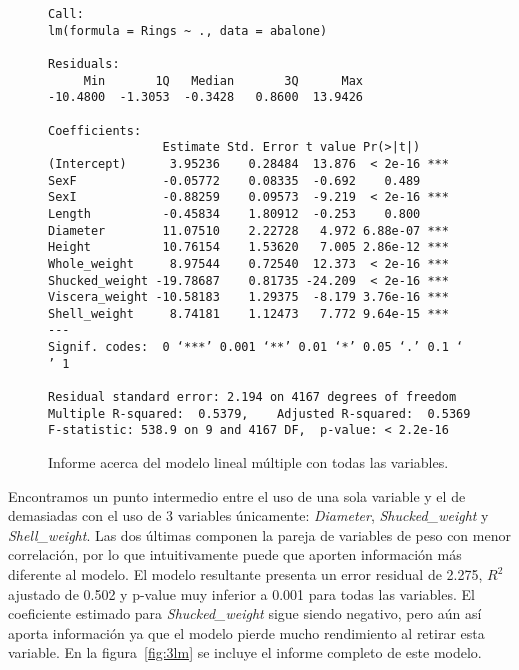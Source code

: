 \documentclass[a4paper, 11pt]{article}
\begin{document}
\begin{figure}[htbp]
  \begin{Verbatim}[fontsize=\scriptsize]
Call:
lm(formula = Rings ~ ., data = abalone)

Residuals:
     Min       1Q   Median       3Q      Max 
-10.4800  -1.3053  -0.3428   0.8600  13.9426 

Coefficients:
                Estimate Std. Error t value Pr(>|t|)    
(Intercept)      3.95236    0.28484  13.876  < 2e-16 ***
SexF            -0.05772    0.08335  -0.692    0.489    
SexI            -0.88259    0.09573  -9.219  < 2e-16 ***
Length          -0.45834    1.80912  -0.253    0.800    
Diameter        11.07510    2.22728   4.972 6.88e-07 ***
Height          10.76154    1.53620   7.005 2.86e-12 ***
Whole_weight     8.97544    0.72540  12.373  < 2e-16 ***
Shucked_weight -19.78687    0.81735 -24.209  < 2e-16 ***
Viscera_weight -10.58183    1.29375  -8.179 3.76e-16 ***
Shell_weight     8.74181    1.12473   7.772 9.64e-15 ***
---
Signif. codes:  0 ‘***’ 0.001 ‘**’ 0.01 ‘*’ 0.05 ‘.’ 0.1 ‘ ’ 1

Residual standard error: 2.194 on 4167 degrees of freedom
Multiple R-squared:  0.5379,	Adjusted R-squared:  0.5369 
F-statistic: 538.9 on 9 and 4167 DF,  p-value: < 2.2e-16
  \end{Verbatim}
  \caption{\label{fig:multlm}Informe acerca del modelo lineal múltiple con todas las variables.}
  
\end{figure}


Encontramos un punto intermedio entre el uso de una sola variable y el de demasiadas con el uso de 3 variables únicamente: \textit{Diameter}, \textit{Shucked\_weight} y \textit{Shell\_weight}. Las dos últimas componen la pareja de variables de peso con menor correlación, por lo que intuitivamente puede que aporten información más diferente al modelo. El modelo resultante presenta un error residual de 2.275, $R^2$ ajustado de 0.502 y p-value muy inferior a 0.001 para todas las variables. El coeficiente estimado para \textit{Shucked\_weight} sigue siendo negativo, pero aún así aporta información ya que el modelo pierde mucho rendimiento al retirar esta variable. En la figura~\ref{fig:3lm} se incluye el informe completo de este modelo.
\end{document}
